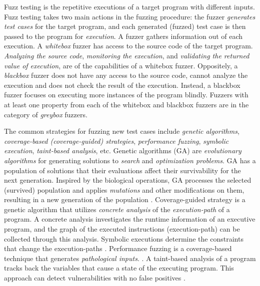 Fuzz testing is the repetitive executions of a target program with different inputs. Fuzz testing takes two main actions in the fuzzing procedure: the fuzzer \textit{generates test cases} for the target program, and each generated (fuzzed) test case is then passed to the program for \textit{execution}. A fuzzer gathers information out of each execution. A \textit{whitebox} fuzzer has access to the source code of the target program. \textit{Analyzing the source code}, \textit{monitoring the execution}, and \textit{validating the returned value of execution}, are of the capabilities of a whitebox fuzzer. Oppositely, a \textit{blackbox} fuzzer does not have any access to the source code, cannot analyze the execution and does not check the result of the execution. Instead, a blackbox fuzzer focuses on executing more instances of the program blindly. Fuzzers with at least one property from each of the whitebox and blackbox fuzzers are in the category of \textit{greybox} fuzzers.

The common strategies for fuzzing new test cases include \textit{genetic algorithms}, \textit{coverage-based (coverage-guided) strategies}, \textit{performance fuzzing}, \textit{symbolic execution}, \textit{taint-based analysis}, etc. Genetic algorithms (GA) are \textit{evolutionary algorithms} for generating solutions to \textit{search} and \textit{optimization problems}. GA has a population of solutions that their evaluations affect their survivability for the next generation. Inspired by the biological operations, GA processes the selected (survived) population and applies \textit{mutations} and other modifications on them, resulting in a new generation of the population \cite{banzhaf1998genetic, whitley1994genetic}. Coverage-guided strategy is a genetic algorithm that utilizes \textit{concrete analysis} of the \textit{execution-path} of a program. A concrete analysis investigates the runtime information of an executive program, and the graph of the executed instructions (execution-path) can be collected through this analysis. Symbolic executions determine the constraints that change the execution-paths \cite{bohme2017coverage}. Performance fuzzing is a coverage-based technique that generates \textit{pathological inputs}.  \cite{lemieux2018perffuzz}. A taint-based analysis of a program tracks back the variables that cause a state of the executing program. This approach can detect vulnerabilities with no false positives \cite{newsome2005dynamic}. 


